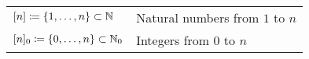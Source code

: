 \begin{table}[H]
\begin{tabularx}{\textwidth}{ | >{\centering\arraybackslash}X | >{\arraybackslash}m{} | }
  \hline \multicolumn{2}{|c|}{\textbf{\large Miscellaneous}} \\  
  \hline $[n]\coloneqq\{1,\dotsc,n\}\subset\mathbb{N}$&Natural numbers from $1$ to $n$\\
  \hline $[n]_0\coloneqq\{0,\dotsc,n\}\subset\mathbb{N}_0$&Integers from $0$ to $n$\\
  \hline
\end{tabularx}
\end{table}
